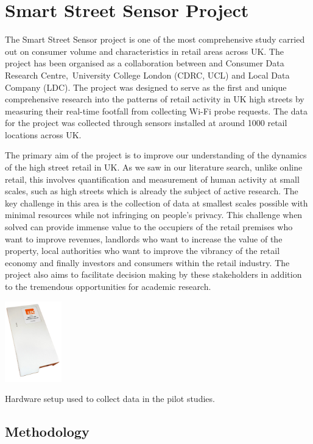 \section{Smart Street Sensor Project}
The Smart Street Sensor project is one of the most comprehensive study carried out on consumer volume and characteristics in retail areas across UK.
The project has been organised as a collaboration between and Consumer Data Research Centre, University College London (CDRC, UCL) and Local Data Company (LDC).
The project was designed to serve as the first and unique comprehensive research into the patterns of retail activity in UK high streets by measuring their real-time footfall from collecting Wi-Fi probe requests.
The data for the project was collected through sensors installed at around 1000 retail locations across UK.

The primary aim of the project is to improve our understanding of the dynamics of the high street retail in UK.
As we saw in our literature search, unlike online retail, this involves quantification and measurement of human activity at small scales, such as high streets which is already the subject of active research.
The key challenge in this area is the collection of data at smallest scales possible with minimal resources while not infringing on people’s privacy.
This challenge when solved can provide immense value to the occupiers of the retail premises who want to improve revenues, landlords who want to increase the value of the property, local authorities who want to improve the vibrancy of the retail economy and finally investors and consumers within the retail industry.
The project also aims to facilitate decision making by these stakeholders in addition to the tremendous opportunities for academic research.

\begin{marginfigure}[-2cm]
  \centering
  \includegraphics[height=3.5cm]{images/sss-hardware.jpg}
  \caption{Hardware setup used to collect data in the pilot studies.}
  \label{figure:collection:sss:hardware}
\end{marginfigure}


\subsection{Methodology}

